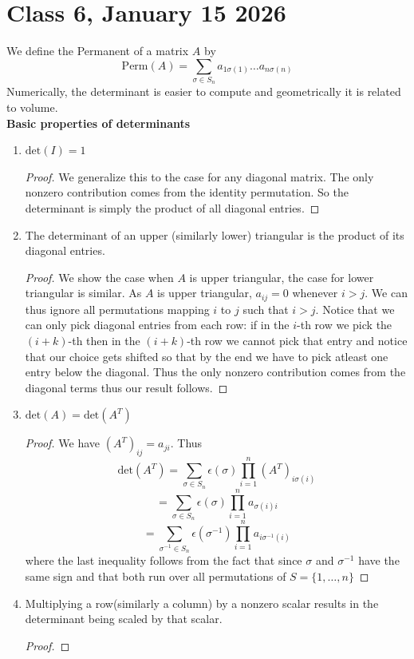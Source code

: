 \documentclass{article}
\begin{document}
\section*{Class 6, January 15 2026}
We define the Permanent of a matrix $A$ by 
$$\text{Perm}(A)=\sum_{\sigma\in S_n}a_{1\sigma(1)}\dots a_{n\sigma(n)}$$
Numerically, the determinant is easier to compute and geometrically it is related to volume. \\
\textbf{Basic properties of determinants}
\begin{enumerate}
    \item $\text{det}(I)=1$
    \begin{proof}
    We generalize this to the case for any diagonal matrix. The only nonzero contribution comes from the identity permutation. So the determinant is simply the product of all diagonal entries.
    \end{proof}
    \item The determinant of an upper (similarly lower) triangular is the product of its diagonal entries.
    \begin{proof}
    We show the case when $A$ is upper triangular, the case for lower triangular is similar. As $A$ is upper triangular, $a_{ij}=0$ whenever $i>j$.
    We can thus ignore all permutations mapping $i$ to $j$ such that $i>j$. Notice that we can only pick diagonal entries from each row: if in the $i$-th row we pick the $(i+k)$-th then in the $(i+k)$-th row we cannot pick that entry and notice that our choice gets shifted so that by the end we have to pick atleast one entry below the diagonal. Thus the only nonzero contribution comes from the diagonal terms thus our result follows.
    \end{proof}
    \item $\text{det}(A)=\text{det}(A^{T})$
    \begin{proof}
    We have $(A^{T})_{ij}=a_{ji}$. Thus
    $$\text{det}(A^T)=\sum_{\sigma\in S_n}\epsilon(\sigma)\prod_{i=1}^{n}(A^T)_{i\sigma(i)}$$
    $$=\sum_{\sigma \in S_n}\epsilon(\sigma)\prod_{i=1}^{n}a_{\sigma(i)i}$$
    $$=\sum_{\sigma^{-1}\in S_n}\epsilon(\sigma^{-1})\prod_{i=1}^{n}a_{i\sigma^{-1}(i)}$$
where the last inequality follows from the fact that since $\sigma$ and $\sigma^{-1}$ have the same sign and that both run over all permutations of $S=\{1,\dots,n\}$
\end{proof}
\item Multiplying a row(similarly a column) by a nonzero scalar results in the determinant being scaled by that scalar.
\begin{proof}

\end{proof}
\end{enumerate}
\end{document}

